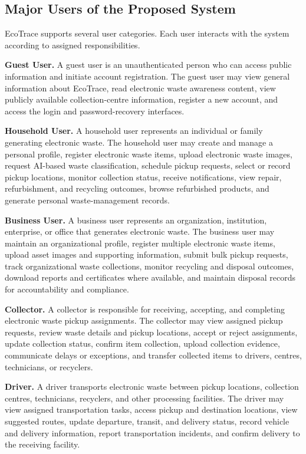 \subsection{Major Users of the Proposed System}
EcoTrace supports several user categories. Each user interacts with the system
according to assigned responsibilities.

\textbf{Guest User.} A guest user is an unauthenticated person who can access
public information and initiate account registration. The guest user may view
general information about EcoTrace, read electronic waste awareness content,
view publicly available collection-centre information, register a new account, and
access the login and password-recovery interfaces.

\textbf{Household User.} A household user represents an individual or family
generating electronic waste. The household user may create and manage a
personal profile, register electronic waste items, upload electronic waste images,
request AI-based waste classification, schedule pickup requests, select or record
pickup locations, monitor collection status, receive notifications, view repair,
refurbishment, and recycling outcomes, browse refurbished products, and
generate personal waste-management records.

\textbf{Business User.} A business user represents an organization, institution,
enterprise, or office that generates electronic waste. The business user may
maintain an organizational profile, register multiple electronic waste items,
upload asset images and supporting information, submit bulk pickup requests,
track organizational waste collections, monitor recycling and disposal outcomes,
download reports and certificates where available, and maintain disposal records
for accountability and compliance.

\textbf{Collector.} A collector is responsible for receiving, accepting, and
completing electronic waste pickup assignments. The collector may view assigned
pickup requests, review waste details and pickup locations, accept or reject
assignments, update collection status, confirm item collection, upload collection
evidence, communicate delays or exceptions, and transfer collected items to
drivers, centres, technicians, or recyclers.

\textbf{Driver.} A driver transports electronic waste between pickup locations,
collection centres, technicians, recyclers, and other processing facilities. The
driver may view assigned transportation tasks, access pickup and destination
locations, view suggested routes, update departure, transit, and delivery status,
record vehicle and delivery information, report transportation incidents, and
confirm delivery to the receiving facility.


